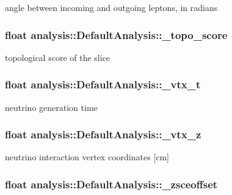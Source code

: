 angle between incoming and outgoing leptons, in radians \hypertarget{classanalysis_1_1DefaultAnalysis_a950efb6f4e8f1ad6dd00e24bc74002c2}{
\subsubsection[{\-\_\-topo\-\_\-score}]{\setlength{\rightskip}{0pt plus 5cm}float analysis\-::\-Default\-Analysis\-::\-\_\-topo\-\_\-score\hspace{0.3cm}{\ttfamily [private]}}}\label{classanalysis_1_1DefaultAnalysis_a950efb6f4e8f1ad6dd00e24bc74002c2}
topological score of the slice \hypertarget{classanalysis_1_1DefaultAnalysis_a39b0367db015ffa41fc4663cb5aeb242}{
\subsubsection[{\-\_\-vtx\-\_\-t}]{\setlength{\rightskip}{0pt plus 5cm}float analysis\-::\-Default\-Analysis\-::\-\_\-vtx\-\_\-t\hspace{0.3cm}{\ttfamily [private]}}}\label{classanalysis_1_1DefaultAnalysis_a39b0367db015ffa41fc4663cb5aeb242}
neutrino generation time \hypertarget{classanalysis_1_1DefaultAnalysis_afd279ca3ddc976b3d509e6c09c0c1514}{
\subsubsection[{\-\_\-vtx\-\_\-z}]{\setlength{\rightskip}{0pt plus 5cm}float analysis\-::\-Default\-Analysis\-::\-\_\-vtx\-\_\-z\hspace{0.3cm}{\ttfamily [private]}}}\label{classanalysis_1_1DefaultAnalysis_afd279ca3ddc976b3d509e6c09c0c1514}
neutrino interaction vertex coordinates \mbox{[}cm\mbox{]} \hypertarget{classanalysis_1_1DefaultAnalysis_af2471e0f1bf6cf3c5bec18f830f41c8d}{
\subsubsection[{\-\_\-zsceoffset}]{\setlength{\rightskip}{0pt plus 5cm}float analysis\-::\-Default\-Analysis\-::\-\_\-zsceoffset\hspace{0.3cm}{\ttfamily [private]}}}\label{classanalysis_1_1DefaultAnalysis_af2471e0f1bf6cf3c5bec18f830f41c8d}
